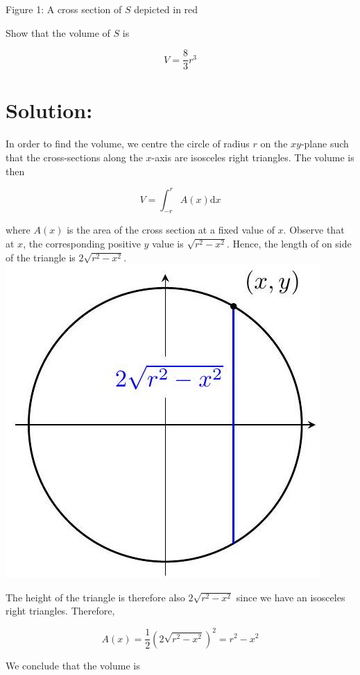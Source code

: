 \documentclass[10pt]{article}
\begin{document}
Figure 1: A cross section of $S$ depicted in red

Show that the volume of $S$ is

$$
V=\frac{8}{3} r^{3}
$$

\section*{Solution:}
In order to find the volume, we centre the circle of radius $r$ on the $x y$-plane such that the cross-sections along the $x$-axis are isosceles right triangles. The volume is then

$$
V=\int_{-r}^{r} A(x) \mathrm{d} x
$$

where $A(x)$ is the area of the cross section at a fixed value of $x$. Observe that at $x$, the corresponding positive $y$ value is $\sqrt{r^{2}-x^{2}}$. Hence, the length of on side of the triangle is $2 \sqrt{r^{2}-x^{2}}$.\\
\includegraphics[max width=\textwidth, center]{2024_12_27_3b8e65ac2e3b34a6249eg-4(1)}

The height of the triangle is therefore also $2 \sqrt{r^{2}-x^{2}}$ since we have an isosceles right triangles. Therefore,

$$
A(x)=\frac{1}{2}\left(2 \sqrt{r^{2}-x^{2}}\right)^{2}=r^{2}-x^{2}
$$

We conclude that the volume is
\end{document}
